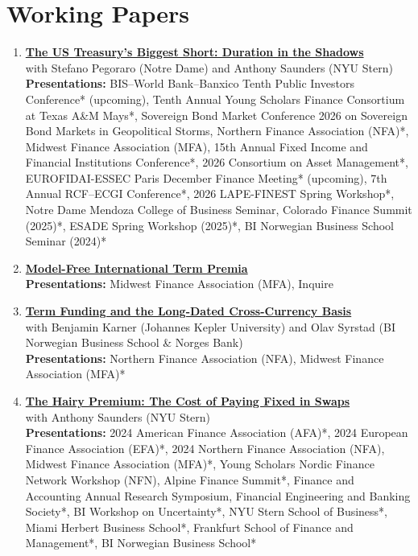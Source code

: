 \documentclass[11pt]{article}
\begin{document}
\section{Working Papers}
\begin{enumerate}[leftmargin=1.5em, itemsep=8pt]

\item \textbf{\href{https://ssrn.com/abstract=5041078}{The US Treasury's Biggest Short: Duration in the Shadows}}\\
with Stefano Pegoraro (Notre Dame) and Anthony Saunders (NYU Stern)\\
\textbf{Presentations:} BIS--World Bank--Banxico Tenth Public Investors Conference* (upcoming), Tenth Annual Young Scholars Finance Consortium at Texas A\&M Mays*, Sovereign Bond Market Conference 2026 on Sovereign Bond Markets in Geopolitical Storms, Northern Finance Association (NFA)*, Midwest Finance Association (MFA), 15th Annual Fixed Income and Financial Institutions Conference*, 2026 Consortium on Asset Management*, EUROFIDAI-ESSEC Paris December Finance Meeting* (upcoming), 7th Annual RCF--ECGI Conference*, 2026 LAPE-FINEST Spring Workshop*, Notre Dame Mendoza College of Business Seminar, Colorado Finance Summit (2025)*, ESADE Spring Workshop (2025)*, BI Norwegian Business School Seminar (2024)*

\item \textbf{\href{https://ssrn.com/abstract=5737482}{Model-Free International Term Premia}}\\
\textbf{Presentations:} Midwest Finance Association (MFA), Inquire

\item \textbf{\href{https://ssrn.com/abstract=6071471}{Term Funding and the Long-Dated Cross-Currency Basis}}\\
with Benjamin Karner (Johannes Kepler University) and Olav Syrstad (BI Norwegian Business School \& Norges Bank)\\
\textbf{Presentations:} Northern Finance Association (NFA), Midwest Finance Association (MFA)*

\item \textbf{\href{https://ssrn.com/abstract=4475821}{The Hairy Premium: The Cost of Paying Fixed in Swaps}}\\
with Anthony Saunders (NYU Stern)\\
\textbf{Presentations:} 2024 American Finance Association (AFA)*, 2024 European Finance Association (EFA)*, 2024 Northern Finance Association (NFA), Midwest Finance Association (MFA)*, Young Scholars Nordic Finance Network Workshop (NFN), Alpine Finance Summit*, Finance and Accounting Annual Research Symposium, Financial Engineering and Banking Society*, BI Workshop on Uncertainty*, NYU Stern School of Business*, Miami Herbert Business School*, Frankfurt School of Finance and Management*, BI Norwegian Business School*


\end{enumerate}
\end{document}
